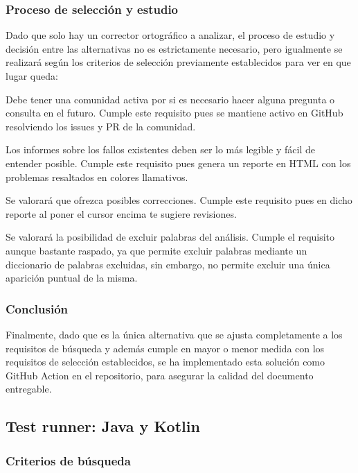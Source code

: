 \subsubsection{Proceso de selección y estudio}
Dado que solo hay un corrector ortográfico a analizar, el proceso de estudio y
decisión entre las alternativas no es estrictamente necesario, pero igualmente
se realizará según los criterios de selección previamente establecidos para ver
en que lugar queda: 

\begin{todolist}
    \item[\xcmark] Debe tener una comunidad activa por si es necesario hacer
    alguna pregunta o consulta en el futuro. Cumple este requisito pues se
    mantiene activo en GitHub resolviendo los issues y PR de la comunidad.
    \item[\xcmark] Los informes sobre los fallos existentes deben ser lo más
    legible y fácil de entender posible. Cumple este requisito pues genera un
    reporte en HTML con los problemas resaltados en colores llamativos.
    \item[\xcmark] Se valorará que ofrezca posibles correcciones. Cumple este
    requisito pues en dicho reporte al poner el cursor encima te sugiere
    revisiones.
    \item[\xcmark] Se valorará la posibilidad de excluir palabras del análisis.
    Cumple el requisito aunque bastante raspado, ya que permite excluir palabras
    mediante un diccionario de palabras excluidas, sin embargo, no permite
    excluir una única aparición puntual de la misma.
\end{todolist}

\subsubsection{Conclusión}
Finalmente, dado que es la única alternativa que se ajusta completamente a los
requisitos de búsqueda y además cumple en mayor o menor medida con los
requisitos de selección establecidos, se ha implementado esta solución como
GitHub Action en el repositorio, para asegurar la calidad del documento
entregable.

\subsection{Test runner: Java y Kotlin}

\subsubsection{Criterios de búsqueda}

